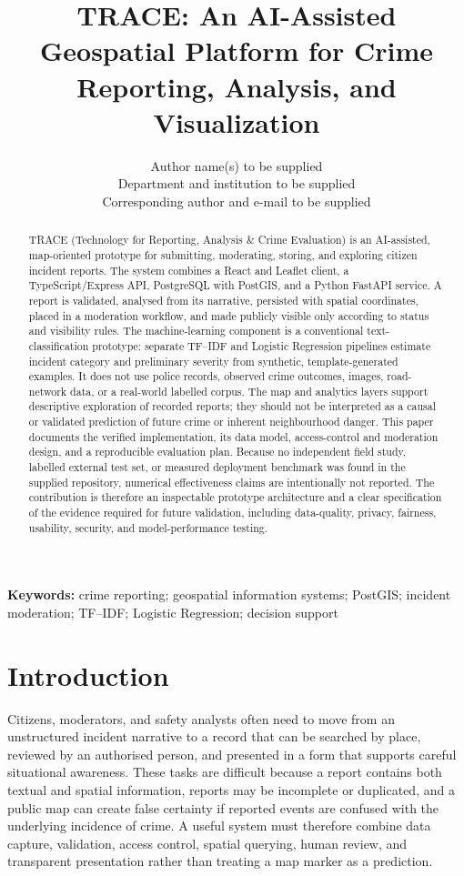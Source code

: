 \documentclass[11pt]{article}
\title{\textbf{TRACE: An AI-Assisted Geospatial Platform for Crime Reporting, Analysis, and Visualization}}
\author{Author name(s) to be supplied\\
\small Department and institution to be supplied\\
\small Corresponding author and e-mail to be supplied}
\date{\placeholder{Insert submission date}}
\begin{document}
\maketitle

\begin{abstract}
TRACE (Technology for Reporting, Analysis \& Crime Evaluation) is an
AI-assisted, map-oriented prototype for submitting, moderating, storing,
and exploring citizen incident reports. The system combines a React and
Leaflet client, a TypeScript/Express API, PostgreSQL with PostGIS, and a
Python FastAPI service. A report is validated, analysed from its narrative,
persisted with spatial coordinates, placed in a moderation workflow, and
made publicly visible only according to status and visibility rules. The
machine-learning component is a conventional text-classification prototype:
separate TF--IDF and Logistic Regression pipelines estimate incident category
and preliminary severity from synthetic, template-generated examples. It
does not use police records, observed crime outcomes, images, road-network
data, or a real-world labelled corpus. The map and analytics layers support
descriptive exploration of recorded reports; they should not be interpreted
as a causal or validated prediction of future crime or inherent neighbourhood
danger. This paper documents the verified implementation, its data model,
access-control and moderation design, and a reproducible evaluation plan.
Because no independent field study, labelled external test set, or measured
deployment benchmark was found in the supplied repository, numerical
effectiveness claims are intentionally not reported. The contribution is
therefore an inspectable prototype architecture and a clear specification of
the evidence required for future validation, including data-quality,
privacy, fairness, usability, security, and model-performance testing.
\end{abstract}

\noindent\textbf{Keywords:} crime reporting; geospatial information systems;
PostGIS; incident moderation; TF--IDF; Logistic Regression; decision support

\tableofcontents
\newpage

\section{Introduction}
\label{sec:introduction}

Citizens, moderators, and safety analysts often need to move from an
unstructured incident narrative to a record that can be searched by place,
reviewed by an authorised person, and presented in a form that supports
careful situational awareness. These tasks are difficult because a report
contains both textual and spatial information, reports may be incomplete or
duplicated, and a public map can create false certainty if reported events
are confused with the underlying incidence of crime. A useful system must
therefore combine data capture, validation, access control, spatial querying,
human review, and transparent presentation rather than treating a map marker
as a prediction.
\end{document}
